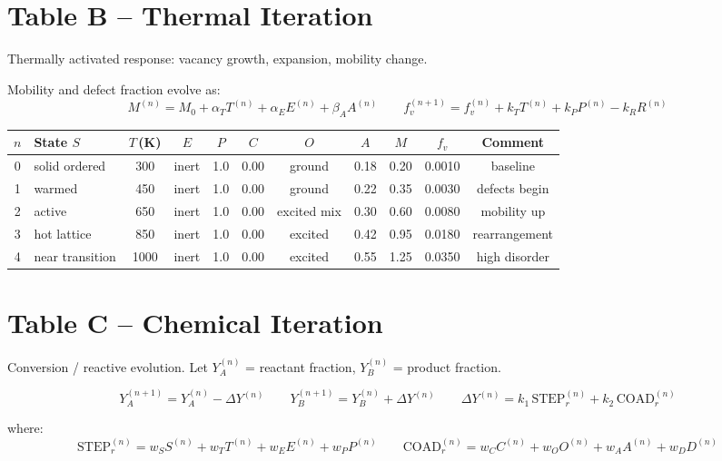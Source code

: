 \documentclass[11pt, letterpaper]{article}
\newcommand{\STEPr}{\mathrm{STEP}_r}
\newcommand{\COADr}{\mathrm{COAD}_r}
\begin{document}
\section{Table B -- Thermal Iteration}

\noindent
Thermally activated response: vacancy growth, expansion, mobility change.

\medskip\noindent
Mobility and defect fraction evolve as:
\[
M^{(n)} = M_0 + \alpha_T T^{(n)} + \alpha_E E^{(n)} + \beta_A A^{(n)}
\qquad
f_v^{(n+1)} = f_v^{(n)} + k_T T^{(n)} + k_P P^{(n)} - k_R R^{(n)}
\]

\bigskip
\noindent
\begin{tabular}{@{}clccccccccc@{}}
\toprule
$n$ & State $S$ & $T$\,(K) & $E$ & $P$ & $C$ & $O$ & $A$ & $M$ & $f_v$ & Comment \\
\midrule
0 & solid ordered  & 300  & inert & 1.0 & 0.00 & ground      & 0.18 & 0.20 & 0.0010 & baseline \\
1 & warmed         & 450  & inert & 1.0 & 0.00 & ground      & 0.22 & 0.35 & 0.0030 & defects begin \\
2 & active         & 650  & inert & 1.0 & 0.00 & excited mix & 0.30 & 0.60 & 0.0080 & mobility up \\
3 & hot lattice    & 850  & inert & 1.0 & 0.00 & excited     & 0.42 & 0.95 & 0.0180 & rearrangement \\
4 & near transition& 1000 & inert & 1.0 & 0.00 & excited     & 0.55 & 1.25 & 0.0350 & high disorder \\
\bottomrule
\end{tabular}

\section{Table C -- Chemical Iteration}

\noindent
Conversion / reactive evolution.  Let $Y_A^{(n)}$ = reactant fraction,
$Y_B^{(n)}$ = product fraction.

\[
Y_A^{(n+1)} = Y_A^{(n)} - \Delta Y^{(n)}
\qquad
Y_B^{(n+1)} = Y_B^{(n)} + \Delta Y^{(n)}
\qquad
\Delta Y^{(n)} = k_1\,\STEPr^{(n)} + k_2\,\COADr^{(n)}
\]

\noindent
where:
\[
\STEPr^{(n)} = w_S S^{(n)} + w_T T^{(n)} + w_E E^{(n)} + w_P P^{(n)}
\qquad
\COADr^{(n)} = w_C C^{(n)} + w_O O^{(n)} + w_A A^{(n)} + w_D D^{(n)}
\]
\end{document}
